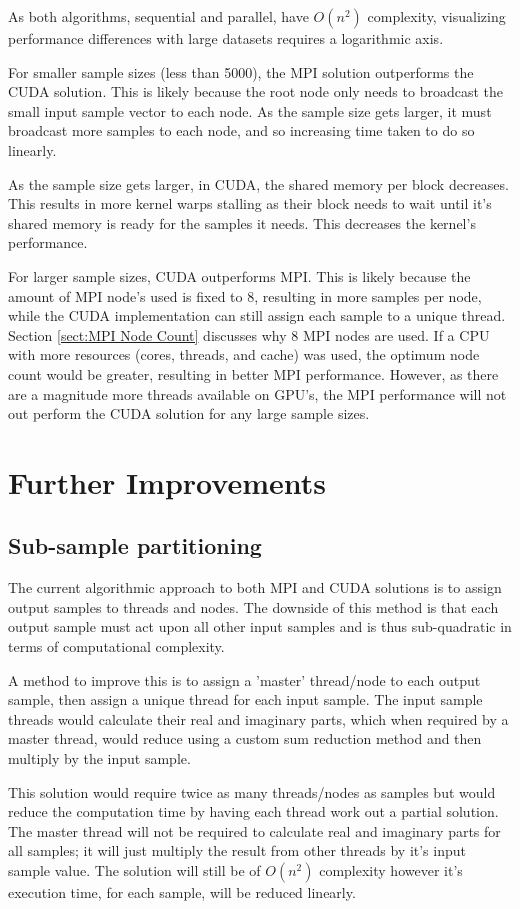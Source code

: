 \documentclass[11pt,a4paper]{article}
\begin{document}
As both algorithms, sequential and parallel, have $O(n^2)$ complexity, visualizing performance differences with large datasets requires a logarithmic axis.

For smaller sample sizes (less than 5000), the MPI solution outperforms the CUDA solution. This is likely because the root node only needs to broadcast the small input sample vector to each node. As  the sample size gets larger, it must broadcast more samples to each node, and so increasing time taken to do so linearly. 

As the sample size gets larger, in CUDA, the shared memory per block decreases. This results in more kernel warps stalling as their block needs to wait until it's shared memory is ready for the samples it needs. This decreases the kernel's performance. 

For larger sample sizes, CUDA outperforms MPI. This is likely because the amount of MPI node's used is fixed to 8, resulting in more samples per node, while the CUDA implementation can still assign each sample to a unique thread. Section \ref{sect:MPI Node Count} discusses why 8 MPI nodes are used. If a CPU with more resources (cores, threads, and cache) was used, the optimum node count would be greater, resulting in better MPI performance. However, as there are a magnitude more threads available on GPU's, the MPI performance will not out perform the CUDA solution for any large sample sizes.

\section{Further Improvements}\label{sect:improvements}
\subsection{Sub-sample partitioning}
The current algorithmic approach to both MPI and CUDA solutions is to assign output samples to threads and nodes. The downside of this method is that each output sample must act upon all other input samples and is thus sub-quadratic in terms of computational complexity.

A method to improve this is to assign a 'master' thread/node to each output sample, then assign a unique thread for each input sample. The input sample threads would calculate their real and imaginary parts, which when required by a master thread, would reduce using a custom sum reduction method and then multiply by the input sample.

This solution would require twice as many threads/nodes as samples but would reduce the computation time by having each thread work out a partial solution. The master thread will not be required to calculate real and imaginary parts for all samples; it will just multiply the result from other threads by it's input sample value. The solution will still be of $O(n^2)$ complexity however it's execution time, for each sample, will be reduced linearly.
\end{document}
